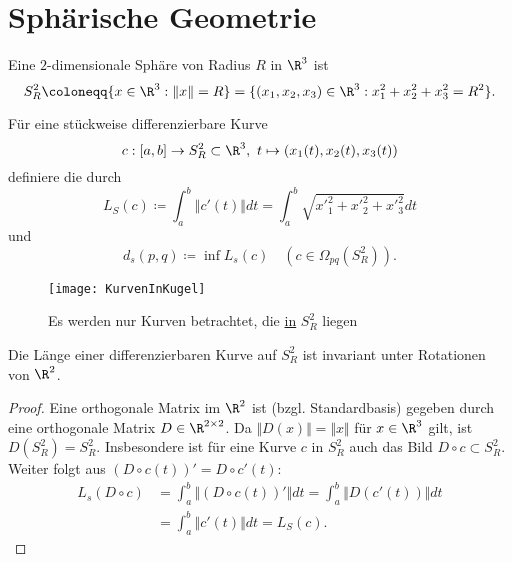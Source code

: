 \section{Sphärische Geometrie}
\begin{example}
  Eine \( 2 \)-dimensionale Sphäre von Radius \( R \) in \( \R^3 \) ist
  \begin{equation*}
    S^2_R \coloneqq \{ x \in \R^3 : \Vert x \Vert = R \} = \{ (x_1, x_2, x_3) \in \R^3 : x_1^2+x_2^2+x_3^2 = R^2 \}\text{.}
  \end{equation*}
  \begin{minipage}{.65\textwidth}
  Für eine stückweise differenzierbare Kurve
    \begin{equation*}
      c: [a,b] \to S^2_R \subset \R^3, \ t \mapsto (x_1(t), x_2(t), x_3(t))
    \end{equation*}
    definiere die  durch
    \begin{equation*}
      L_S(c) \coloneqq \int_a^b \Vert c'(t) \Vert dt = \int_a^b \sqrt{{x'}_1^2+{x'}_2^2+{x'}_3^2}dt
    \end{equation*}
    und
    \begin{equation*}
      d_s(p,q) \coloneqq \inf L_s(c) \quad (c \in \Omega_{pq}(S^2_R))\text{.}
    \end{equation*}
  \end{minipage}
  \hfill
  \begin{minipage}{.25\textwidth}
    \begin{figure}[H]
      \texttt{[image: KurvenInKugel]}
      \caption{Es werden nur Kurven betrachtet, die \underline{in} \( S_R^2 \) liegen}
    \end{figure}
  \end{minipage}
\end{example}

\begin{lemma}\label{lemma:kurvenlaengen}
  Die Länge einer differenzierbaren Kurve auf \( S^2_R \) ist invariant unter Rotationen von \( \R^2 \).
  \begin{proof}
    Eine orthogonale Matrix im \( \R^2 \) ist (bzgl. Standardbasis) gegeben durch eine orthogonale Matrix \( D \in \R^{2 \times 2} \). Da \( \Vert D(x) \Vert = \Vert x \Vert \) für \( x \in \R^3 \) gilt, ist \( D(S^2_R) = S^2_R \). Insbesondere ist für eine Kurve \( c \) in \( S^2_R \) auch das Bild \( D \circ c \subset S^2_R \). \\
    Weiter folgt aus \( (D \circ c(t))' = D \circ c'(t) \):
    \begin{align*}
      L_s(D \circ c) &= \int_a^b \Vert (D \circ c(t))' \Vert dt = \int_a^b \Vert D(c'(t)) \Vert dt \\
        &= \int_a^b \Vert c'(t) \Vert dt = L_S(c)\text{.}
    \end{align*}
  \end{proof}
\end{lemma}

